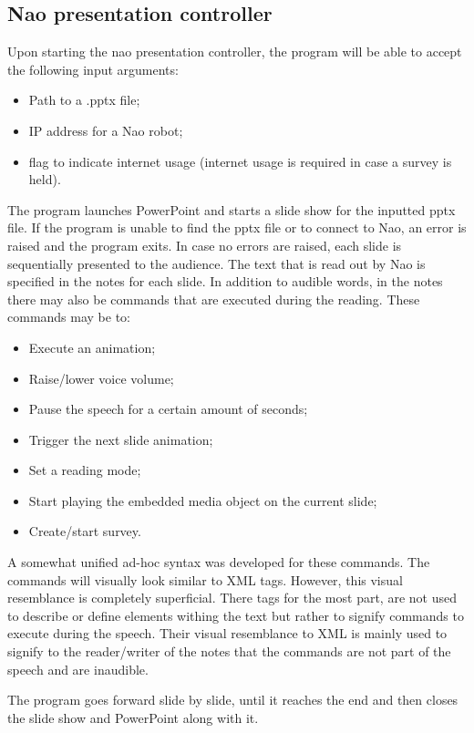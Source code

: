 \documentclass[12pt, fleqn, a4paper]{article}
\begin{document}
\subsection{Nao presentation controller}
Upon starting the nao presentation controller, the program will be able to accept the following input arguments:
\begin{itemize}
	\item Path to a .pptx file;
	\item IP address for a Nao robot;
	\item flag to indicate internet usage (internet usage is required in case a survey is held).
\end{itemize}
The program launches PowerPoint and starts a slide show for the inputted pptx file. If the program is unable to find the pptx file or to connect to Nao, an error is raised and the program exits. In case no errors are raised, each slide is sequentially presented to the audience. The text that is read out by Nao is specified in the notes for each slide. In addition to audible words, in the notes there may also be commands that are executed during the reading. These commands may be to:
\begin{itemize}
	\item Execute an animation;
	\item Raise/lower voice volume;
	\item Pause the speech for a certain amount of seconds;
	\item Trigger the next slide animation;
	\item Set a reading mode;
	\item Start playing the embedded media object on the current slide;
	\item Create/start survey.
\end{itemize}
A somewhat unified ad-hoc syntax was developed for these commands. The commands will visually look similar to XML tags. However, this visual resemblance is completely superficial. There tags for the most part, are not used to describe or define elements withing the text but rather to signify commands to execute during the speech. 
Their visual resemblance to XML is mainly used to signify to the reader/writer of the notes that the commands are not part of the speech and are inaudible.\par
The program goes forward slide by slide, until it reaches the end and then closes the slide show and PowerPoint along with it.
\end{document}
